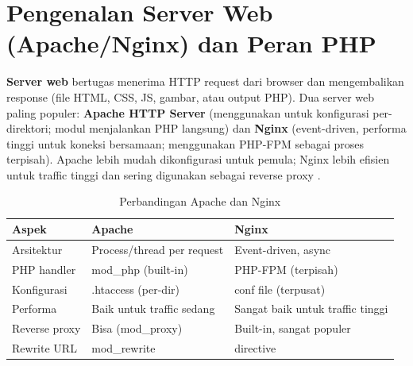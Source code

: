 \section{Pengenalan Server Web (Apache/Nginx) dan Peran PHP}

\textbf{Server web} bertugas menerima HTTP request dari browser dan mengembalikan response (file HTML, CSS, JS, gambar, atau output PHP). Dua server web paling populer: \textbf{Apache HTTP Server} (menggunakan  untuk konfigurasi per-direktori; modul  menjalankan PHP langsung) dan \textbf{Nginx} (event-driven, performa tinggi untuk koneksi bersamaan; menggunakan PHP-FPM sebagai proses terpisah). Apache lebih mudah dikonfigurasi untuk pemula; Nginx lebih efisien untuk traffic tinggi dan sering digunakan sebagai reverse proxy \cite{mdnDeploy}.

\begin{table}[ht]
\centering
\begin{tabular}{|P{3cm}|P{5cm}|P{5cm}|}
\hline
\textbf{Aspek} & \textbf{Apache} & \textbf{Nginx} \\
\hline
Arsitektur & Process/thread per request & Event-driven, async \\
\hline
PHP handler & mod\_php (built-in) & PHP-FPM (terpisah) \\
\hline
Konfigurasi & .htaccess (per-dir) & conf file (terpusat) \\
\hline
Performa & Baik untuk traffic sedang & Sangat baik untuk traffic tinggi \\
\hline
Reverse proxy & Bisa (mod\_proxy) & Built-in, sangat populer \\
\hline
Rewrite URL & mod\_rewrite &  directive \\
\hline
\end{tabular}
\caption{Perbandingan Apache dan Nginx}
\end{table}

